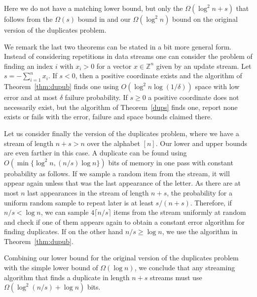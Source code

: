 Here we do not have a matching lower bound, but only the $\Omega(\log^2n+s)$ that
follows from the $\Omega(s)$ bound in \cite{GopalanJaikumar} and our
$\Omega(\log^2 n)$ bound on the original version of the duplicates problem.

We remark the last two theorems can be stated in a bit more general
form. Instead of considering repetitions in data streams one can consider the
problem of finding an index $i$ with $x_i>0$ for a vector
$x\in\mathbb Z^n$ given by an update stream. Let
$s=-\sum_{i=1}^nx_i$. If $s<0$, then a positive coordinate exists and the
algorithm of Theorem~\ref{thm:dupub} finds one using $O(\log^2 n\log(1/\delta))$
space with low error and at most $\delta$ failure probability.
If $s\ge0$ a positive coordinate does not necessarily exist, but the algorithm
of Theorem~\ref{dups} finds one, report none exists or fails with the error,
failure and space bounds claimed there.

Let us consider finally the version of the duplicates problem, where we have a
stream of length $n+s>n$ over the alphabet $[n]$. Our lower and upper bounds
are even farther in this case. A duplicate can be found using $O(\min\{\log^2n,
(n/s)\log n\})$ bits of memory in one pass with constant probability as
follows. If we sample a random item from the stream, it will appear again
unless that was the last appearance of the letter. As there are at most $n$
last appearances in the stream of length $n+s$, the probability for a uniform
random sample to repeat later is at least $s/(n+s)$. Therefore, if $n/s < \log
n$, we can sample $4\lceil n/s\rceil$ items from the stream uniformly at
random and check if one of them appears again to obtain a constant error
algorithm for finding duplicates. If on the other hand $n/s \geq \log n$, we use
the algorithm in Theorem~\ref{thm:dupub}.

Combining our lower bound for the original version of the duplicates problem 
with the simple lower bound of  $\Omega(\log n)$, we conclude that any 
streaming algorithm that finds a duplicate in length $n+s$ streams must use 
$\Omega(\log^2(n/s)+ \log n)$ bits.

